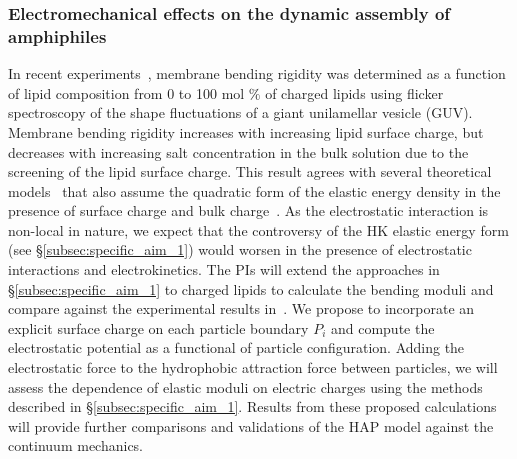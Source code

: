 
\subsubsection{Electromechanical effects on the dynamic assembly of amphiphiles \label{subsubsec:em_effects}}
In recent experiments~\cite{FaizEtAl2019_SoftMatt}, membrane bending
rigidity was determined as a function of lipid composition from 0 to 100
mol $\%$ of charged lipids using flicker spectroscopy of the shape
fluctuations of a giant unilamellar vesicle (GUV).
Membrane bending rigidity increases with increasing lipid surface
charge, but decreases with increasing salt concentration in the bulk
solution due to the screening of the lipid surface charge. This
result agrees
with several theoretical models~\cite{Kralchevsky1996_JCIS,
May1996_JChemPhys, LoubetEtAl2013_PRE} that also assume the quadratic
form of the elastic energy density in the presence of surface charge and
bulk charge~\cite{DuplantierGoldstein1990_PRL, Winterhalter1992_JPC}. As
the electrostatic interaction is non-local in nature, we expect that the
controversy of the HK elastic energy form (see
\S\ref{subsec:specific_aim_1}) would worsen in the presence of
electrostatic interactions and electrokinetics. The PIs will extend the
approaches in \S\ref{subsec:specific_aim_1} to charged lipids to
calculate the bending moduli and compare against the experimental
results in~\cite{FaizEtAl2019_SoftMatt}. We propose to incorporate an
explicit surface charge on each particle boundary $P_i$ and compute the
electrostatic potential as a functional of particle configuration.
Adding the electrostatic force to the hydrophobic attraction force
between particles, we will assess the dependence of elastic moduli on
electric charges using the methods described in
\S\ref{subsec:specific_aim_1}. Results from these proposed calculations
will provide further comparisons and validations of the HAP model
against the continuum mechanics.

